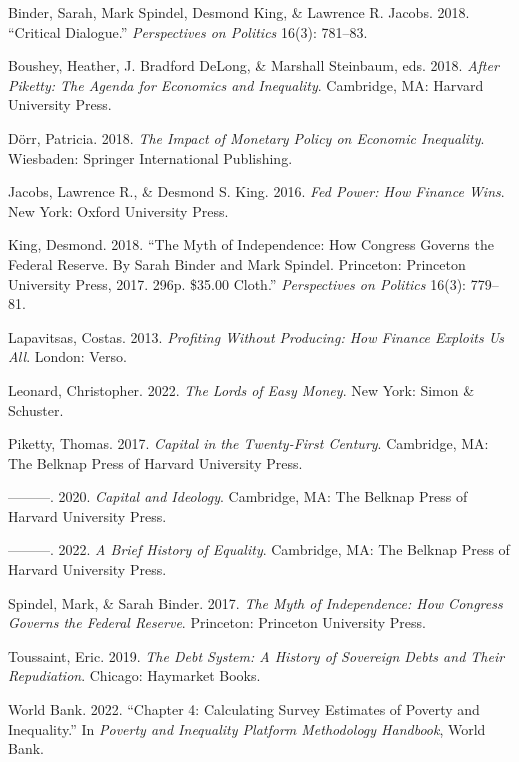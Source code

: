 \documentclass[
  12pt,
]{article}
\newlength{\cslhangindent}
\newlength{\cslentryspacingunit} %
\newenvironment{CSLReferences}[2] %
 {%
  \setlength{\parindent}{0pt}
  \ifodd #1
  \let\oldpar\par
  \def\par{\hangindent=\cslhangindent\oldpar}
  \fi
  \setlength{\parskip}{#2\cslentryspacingunit}
 }%
 {}
\begin{document}
\hypertarget{refs}{}
\begin{CSLReferences}{1}{0}
\leavevmode{}%
Binder, Sarah, Mark Spindel, Desmond King, \& Lawrence R. Jacobs. 2018.
{``Critical Dialogue.''} \emph{Perspectives on Politics} 16(3): 781--83.

\leavevmode{}%
Boushey, Heather, J. Bradford DeLong, \& Marshall Steinbaum, eds. 2018.
\emph{After Piketty: The Agenda for Economics and Inequality}.
Cambridge, MA: Harvard University Press.

\leavevmode{}%
Dörr, Patricia. 2018. \emph{The Impact of Monetary Policy on Economic
Inequality}. Wiesbaden: Springer International Publishing.

\leavevmode{}%
Jacobs, Lawrence R., \& Desmond S. King. 2016. \emph{Fed Power: How
Finance Wins}. New York: Oxford University Press.

\leavevmode{}%
King, Desmond. 2018. {``The Myth of Independence: How Congress Governs
the Federal Reserve. By Sarah Binder and Mark Spindel. Princeton:
Princeton University Press, 2017. 296p. \$35.00 Cloth.''}
\emph{Perspectives on Politics} 16(3): 779--81.

\leavevmode{}%
Lapavitsas, Costas. 2013. \emph{Profiting Without Producing: How Finance
Exploits Us All}. London: Verso.

\leavevmode{}%
Leonard, Christopher. 2022. \emph{The Lords of Easy Money}. New York:
Simon \& Schuster.

\leavevmode{}%
Piketty, Thomas. 2017. \emph{Capital in the Twenty-First Century}.
Cambridge, MA: The Belknap Press of Harvard University Press.

\leavevmode{}%
---------. 2020. \emph{Capital and Ideology}. Cambridge, MA: The Belknap
Press of Harvard University Press.

\leavevmode{}%
---------. 2022. \emph{A Brief History of Equality}. Cambridge, MA: The
Belknap Press of Harvard University Press.

\leavevmode{}%
Spindel, Mark, \& Sarah Binder. 2017. \emph{The Myth of Independence:
How Congress Governs the Federal Reserve}. Princeton: Princeton
University Press.

\leavevmode{}%
Toussaint, Eric. 2019. \emph{The Debt System: A History of Sovereign
Debts and Their Repudiation}. Chicago: Haymarket Books.

\leavevmode{}%
World Bank. 2022. {``Chapter 4: Calculating Survey Estimates of Poverty
and Inequality.''} In \emph{Poverty and Inequality Platform Methodology
Handbook}, World Bank.

\end{CSLReferences}
\end{document}
